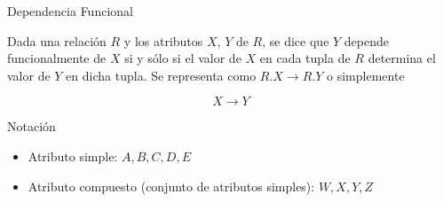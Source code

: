 \begin{frame}{Dependencia Funcional}
  

    Dada una relaci\'on $R$ y los atributos $X$, $Y$ de $R$, se dice que $Y$ depende funcionalmente de $X$ si
    y s\'olo si el valor de $X$ en cada tupla de $R$ determina el valor
    de $Y$ en dicha tupla. Se representa como $R.X \to R.Y$ o simplemente

    \begin{Huge}
        
        $$
            X \to Y
        $$
    \end{Huge}

    \begin{block}{Notaci\'on}
        \begin{itemize}
            \item Atributo simple: $A,B,C,D,E$
            \item Atributo compuesto (conjunto de atributos simples): $W,X,Y,Z$
        \end{itemize}
    \end{block}
\end{frame}


